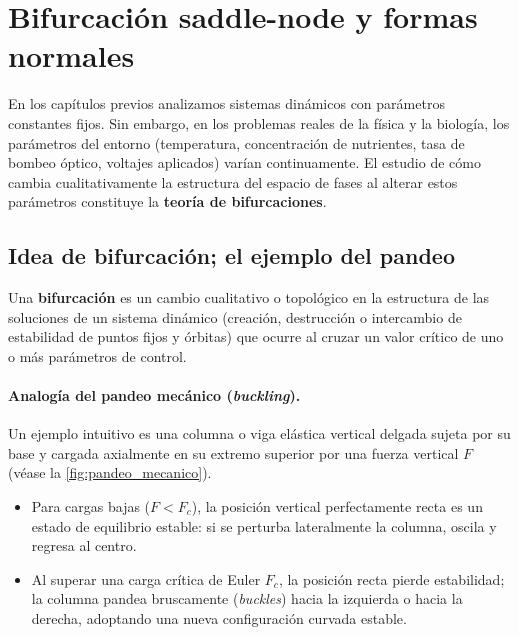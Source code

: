 \section{Bifurcación saddle-node y formas normales}
\label{sec:saddlenode}

En los capítulos previos analizamos sistemas dinámicos con parámetros constantes fijos. Sin embargo, en los problemas reales de la física y la biología, los parámetros del entorno (temperatura, concentración de nutrientes, tasa de bombeo óptico, voltajes aplicados) varían continuamente. El estudio de cómo cambia cualitativamente la estructura del espacio de fases al alterar estos parámetros constituye la \textbf{teoría de bifurcaciones}.

\subsection{Idea de bifurcación; el ejemplo del pandeo}

\begin{definition}[Bifurcación]
    Una \textbf{bifurcación} es un cambio cualitativo o topológico en la estructura de las soluciones de un sistema dinámico (creación, destrucción o intercambio de estabilidad de puntos fijos y órbitas) que ocurre al cruzar un valor crítico de uno o más parámetros de control.
\end{definition}

\paragraph{Analogía del pandeo mecánico (\emph{buckling}).}
Un ejemplo intuitivo es una columna o viga elástica vertical delgada sujeta por su base y cargada axialmente en su extremo superior por una fuerza vertical $F$ (véase la \cref{fig:pandeo_mecanico}).
\begin{itemize}
    \item Para cargas bajas ($F < F_c$), la posición vertical perfectamente recta es un estado de equilibrio estable: si se perturba lateralmente la columna, oscila y regresa al centro.
    \item Al superar una carga crítica de Euler $F_c$, la posición recta pierde estabilidad; la columna pandea bruscamente (\emph{buckles}) hacia la izquierda o hacia la derecha, adoptando una nueva configuración curvada estable.
\end{itemize}

